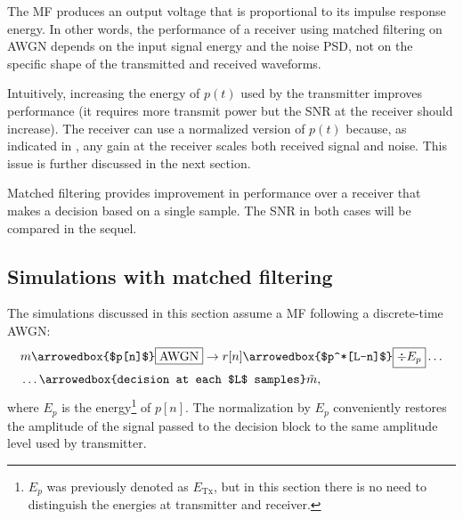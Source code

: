 The MF produces an output voltage that is proportional to its impulse response energy.
In other words, the performance of a receiver using matched filtering on AWGN depends on the input signal energy and the noise PSD, not on the specific shape of the transmitted and received waveforms. 

Intuitively, increasing the energy of $p(t)$ used by the transmitter improves performance 
(it requires more transmit power but the SNR at the receiver should increase). The receiver can use a normalized version of $p(t)$ because, as indicated in , any
gain at the receiver scales both received signal and noise. This issue is further discussed in the next section.


Matched filtering provides improvement in performance over a receiver that makes a decision based on a single sample.
The SNR in both cases will be compared in the sequel.

\subsection{Simulations with matched filtering}
\label{sec:mfsimulations}
The simulations discussed in this section assume a MF following a discrete-time AWGN:
\begin{align*}
&m \arrowedbox{$p[n]$} \fbox{AWGN} \rightarrow r[n] \arrowedbox{$p^*[L-n]$} \fbox{$\div E_p$}\ldots\\
&\ldots \arrowedbox{decision at each $L$ samples}  \tilde m,
\end{align*}
where $E_p$ is the energy\footnote{$E_p$ was previously denoted as $E_{\textrm{Tx}}$, but in this section there is no need to distinguish the energies at transmitter and receiver.} of $p[n]$. The normalization by $E_p$ conveniently restores the amplitude of the signal passed to the decision block to the same amplitude level used by transmitter.

